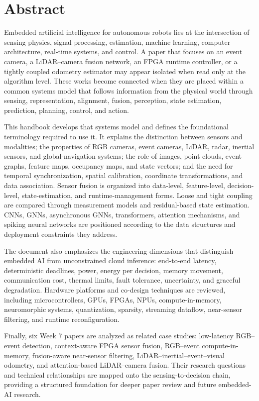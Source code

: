 \chapter*{Abstract}

Embedded artificial intelligence for autonomous robots lies at the intersection of sensing physics, signal processing, estimation, machine learning, computer architecture, real-time systems, and control. A paper that focuses on an event camera, a LiDAR--camera fusion network, an FPGA runtime controller, or a tightly coupled odometry estimator may appear isolated when read only at the algorithm level. These works become connected when they are placed within a common systems model that follows information from the physical world through sensing, representation, alignment, fusion, perception, state estimation, prediction, planning, control, and action.

This handbook develops that systems model and defines the foundational terminology required to use it. It explains the distinction between sensors and modalities; the properties of RGB cameras, event cameras, LiDAR, radar, inertial sensors, and global-navigation systems; the role of images, point clouds, event graphs, feature maps, occupancy maps, and state vectors; and the need for temporal synchronization, spatial calibration, coordinate transformations, and data association. Sensor fusion is organized into data-level, feature-level, decision-level, state-estimation, and runtime-management forms. Loose and tight coupling are compared through measurement models and residual-based state estimation. CNNs, GNNs, asynchronous GNNs, transformers, attention mechanisms, and spiking neural networks are positioned according to the data structures and deployment constraints they address.

The document also emphasizes the engineering dimensions that distinguish embedded AI from unconstrained cloud inference: end-to-end latency, deterministic deadlines, power, energy per decision, memory movement, communication cost, thermal limits, fault tolerance, uncertainty, and graceful degradation. Hardware platforms and co-design techniques are reviewed, including microcontrollers, GPUs, FPGAs, NPUs, compute-in-memory, neuromorphic systems, quantization, sparsity, streaming dataflow, near-sensor filtering, and runtime reconfiguration.

Finally, six Week 7 papers are analyzed as related case studies: low-latency RGB--event detection, context-aware FPGA sensor fusion, RGB--event compute-in-memory, fusion-aware near-sensor filtering, LiDAR--inertial--event--visual odometry, and attention-based LiDAR--camera fusion. Their research questions and technical relationships are mapped onto the sensing-to-decision chain, providing a structured foundation for deeper paper review and future embedded-AI research.
